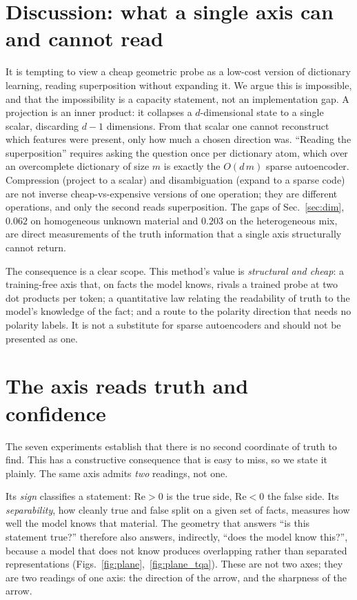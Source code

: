 \documentclass[11pt]{article}
\begin{document}
\section{Discussion: what a single axis can and cannot read}
\label{sec:discussion}

It is tempting to view a cheap geometric probe as a low-cost version of
dictionary learning, reading superposition without expanding it. We argue
this is impossible, and that the impossibility is a capacity statement, not
an implementation gap. A projection is an inner product: it collapses a
$d$-dimensional state to a single scalar, discarding $d - 1$ dimensions. From
that scalar one cannot reconstruct which features were present, only how much
a chosen direction was. ``Reading the superposition'' requires asking the
question once per dictionary atom, which over an overcomplete dictionary of
size $m$ is exactly the $O(d\,m)$ sparse autoencoder. Compression (project to
a scalar) and disambiguation (expand to a sparse code) are not inverse
cheap-vs-expensive versions of one operation; they are different operations,
and only the second reads superposition. The gaps of
Sec.~\ref{sec:dim}, $0.062$ on homogeneous unknown material and $0.203$ on
the heterogeneous mix, are direct measurements of the truth information that
a single axis structurally cannot return.

The consequence is a clear scope. This method's value is \emph{structural and
cheap}: a training-free axis that, on facts the model knows, rivals a trained
probe at two dot products per token; a quantitative law relating the
readability of truth to the model's knowledge of the fact; and a route to the
polarity direction that needs no polarity labels. It is not a substitute for
sparse autoencoders and should not be presented as one.

\section{The axis reads truth and confidence}
\label{sec:meta}

The seven experiments establish that there is no second coordinate of truth
to find. This has a constructive consequence that is easy to miss, so we
state it plainly. The same axis admits \emph{two} readings, not one.

Its \emph{sign} classifies a statement: $\mathrm{Re} > 0$ is the true side,
$\mathrm{Re} < 0$ the false side. Its \emph{separability}, how cleanly true
and false split on a given set of facts, measures how well the model knows
that material. The geometry that answers ``is this statement true?''
therefore also answers, indirectly, ``does the model know this?'', because a
model that does not know produces overlapping rather than separated
representations (Figs.~\ref{fig:plane},~\ref{fig:plane_tqa}). These are not
two axes; they are two readings of one axis: the direction of the arrow, and
the sharpness of the arrow.
\end{document}
